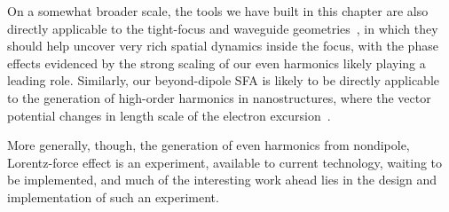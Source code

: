 On a somewhat broader scale, the tools we have built in this chapter are also directly applicable to the tight-focus and waveguide geometries~\cite{ galloway_lorentz_2016}, in which they should help uncover very rich spatial dynamics inside the focus, with the phase effects evidenced by the strong scaling of our even harmonics likely playing a leading role. Similarly, our beyond-dipole SFA is likely to be directly applicable to the generation of high-order harmonics in nanostructures, where the vector potential changes in length scale of the electron excursion~\cite{chacon_hhg-plasmonic_2015, ciappina_attosecond-nanoscale_2016}.

More generally, though, the generation of even harmonics from nondipole, Lorentz-force effect is an experiment, available to current technology, waiting to be implemented, and much of the interesting work ahead lies in the design and implementation of such an experiment.














































